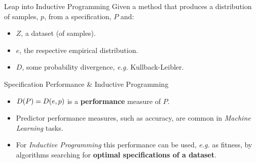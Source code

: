 \documentclass{beamer}
\newcommand{\at}[1]{\ensuremath{\!\del{#1}}}
\begin{document}
\begin{frame}{Leap into Inductive Programming}
    Given a method that produces a distribution of samples, $p$, from a specification, $P$ and:
    \begin{itemize}
        \item $Z$, a dataset (of samples).
        \item $e$, the respective empirical distribution.
        \item $D$, some probability divergence, \textit{e.g.} Kullback-Leibler.
    \end{itemize}
    \begin{block}{Specification Performance \& Inductive Programming}    
        \begin{itemize}
            \item $D\at{P} = D\at{e, p}$ is a \textbf{performance} measure of $P$.
            \item Predictor performance measures, such as accuracy, are common in \textit{Machine Learning} tasks.
            \item For \textit{Inductive Programming} this performance can be used, \textit{e.g.} as fitness, by algorithms searching for \textbf{optimal specifications of a dataset}.
        \end{itemize}
    \end{block}
\end{frame}
\end{document}
